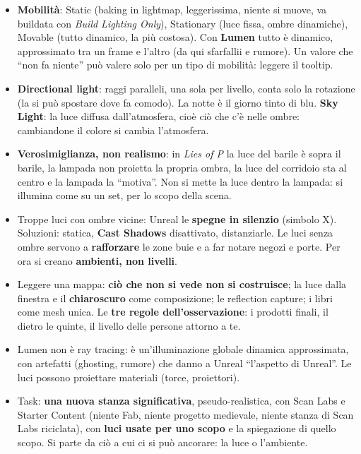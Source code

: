 \begin{itemize}
        \emph{Unlit}; la \textbf{roughness} sparpaglia i rimbalzi e spegne i
        riflessi (anche con una mappa in scala di grigi: i bordi rovinati); lo
        \textbf{specular} è la riflettenza, e interagisce con la roughness. Gli
        \textbf{specular highlight} si spostano con il punto di vista.
  \item \textbf{Mobilità}: Static (baking in lightmap, leggerissima, niente si
        muove, va buildata con \emph{Build Lighting Only}), Stationary (luce fissa,
        ombre dinamiche), Movable (tutto dinamico, la più costosa). Con
        \textbf{Lumen} tutto è dinamico, approssimato tra un frame e l'altro (da qui
        sfarfallii e rumore). Un valore che ``non fa niente'' può valere solo per
        un tipo di mobilità: leggere il tooltip.
  \item \textbf{Directional light}: raggi paralleli, una sola per livello, conta
        solo la rotazione (la si può spostare dove fa comodo). La notte è il giorno
        tinto di blu. \textbf{Sky Light}: la luce diffusa dall'atmosfera, cioè ciò
        che c'è nelle ombre: cambiandone il colore si cambia l'atmosfera.
  \item \textbf{Verosimiglianza, non realismo}: in \emph{Lies of P} la luce del
        barile è sopra il barile, la lampada non proietta la propria ombra, la luce
        del corridoio sta al centro e la lampada la ``motiva''. Non si mette la luce
        dentro la lampada: si illumina come su un set, per lo scopo della scena.
  \item Troppe luci con ombre vicine: Unreal le \textbf{spegne in silenzio}
        (simbolo X). Soluzioni: statica, \textbf{Cast Shadows} disattivato,
        distanziarle. Le luci senza ombre servono a \textbf{rafforzare} le zone
        buie e a far notare negozi e porte. Per ora si creano \textbf{ambienti, non
        livelli}.
  \item Leggere una mappa: \textbf{ciò che non si vede non si costruisce}; la luce
        dalla finestra e il \textbf{chiaroscuro} come composizione; le reflection
        capture; i libri come mesh unica. Le \textbf{tre regole dell'osservazione}:
        i prodotti finali, il dietro le quinte, il livello delle persone attorno a
        te.
  \item Lumen non è ray tracing: è un'illuminazione globale dinamica approssimata,
        con artefatti (ghosting, rumore) che danno a Unreal ``l'aspetto di
        Unreal''. Le luci possono proiettare materiali (torce, proiettori).
  \item Task: \textbf{una nuova stanza significativa}, pseudo-realistica, con Scan
        Labs e Starter Content (niente Fab, niente progetto medievale, niente stanza
        di Scan Labs riciclata), con \textbf{luci usate per uno scopo} e la
        spiegazione di quello scopo. Si parte da ciò a cui ci si può ancorare: la
        luce o l'ambiente.
\end{itemize}
